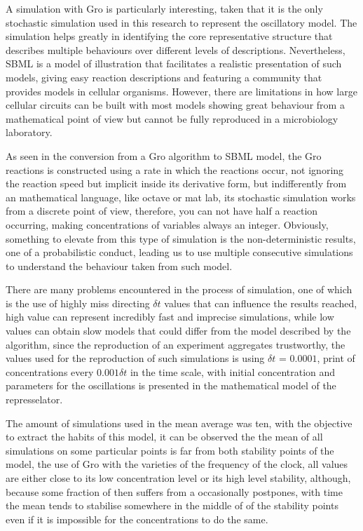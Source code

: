 \documentclass[12pt]{article}
\begin{document}
A simulation with Gro is particularly interesting, taken that it is the only stochastic simulation used in this research to represent the oscillatory model. The simulation helps greatly in identifying the core representative structure that describes multiple behaviours over different levels of descriptions. Nevertheless, SBML is a model of illustration that facilitates a realistic presentation of such models, giving easy reaction descriptions and featuring a community that provides models in cellular organisms. However, there are limitations in how large cellular circuits can be built with most models showing great behaviour from a mathematical point of view but cannot be fully reproduced in a microbiology laboratory.

As seen in the conversion from a Gro algorithm to SBML model, the Gro reactions is constructed using a rate in which the reactions occur, not ignoring the reaction speed but implicit inside its derivative form, but indifferently from an mathematical language, like octave or mat lab, its stochastic simulation works from a discrete point of view, therefore, you can not have half a reaction occurring, making concentrations of variables always an integer. Obviously, something to elevate from this type of simulation is the non-deterministic results, one of a probabilistic conduct, leading us to use multiple consecutive simulations to understand the behaviour taken from such model.

There are many problems encountered in the process of simulation, one of which is the use of highly miss directing $\delta{t}$ values that can influence the results reached, high value can represent incredibly fast and imprecise simulations, while low values can obtain slow models that could differ from the model described by the algorithm, since the reproduction of an experiment aggregates trustworthy, the values used for the reproduction of such simulations is using $\delta{t}$ = $0.0001$, print of concentrations every $0.001\delta{t}$ in the time scale, with initial concentration and parameters for the oscillations is presented in the mathematical model of the represselator.

The amount of simulations used in the mean average was ten, with the objective to extract the habits of this model, it can be observed the the mean of all simulations on some particular points is far from both stability points of the model, the use of Gro with the varieties of the frequency of the clock, all values are either close to its low concentration level or its high level stability, although, because some fraction of then suffers from a occasionally postpones, with time the mean tends to stabilise somewhere in the middle of of the stability points even if it is impossible for the concentrations to do the same.
\end{document}
